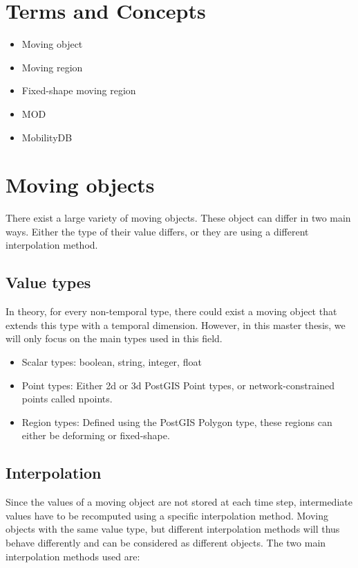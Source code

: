 \section{Terms and Concepts}



\begin{itemize}
	\item Moving object
	\item Moving region
	\item Fixed-shape moving region
	\item MOD
	\item MobilityDB
\end{itemize}

\section{Moving objects}

There exist a large variety of moving objects. These object can differ in two main ways. Either the type of their value differs, or they are using a different interpolation method.

	\subsection{Value types}

	In theory, for every non-temporal type, there could exist a moving object that extends this type with a temporal dimension. However, in this master thesis, we will only focus on the main types used in this field.

	\begin{itemize}
		\item Scalar types: boolean, string, integer, float
		\item Point types: Either 2d or 3d PostGIS Point types, or network-constrained points called npoints.
		\item Region types: Defined using the PostGIS Polygon type, these regions can either be deforming or fixed-shape.
	\end{itemize}

	\subsection{Interpolation}

	Since the values of a moving object are not stored at each time step, intermediate values have to be recomputed using a specific interpolation method. Moving objects with the same value type, but different interpolation methods will thus behave differently and can be considered as different objects. The two main interpolation methods used are:

